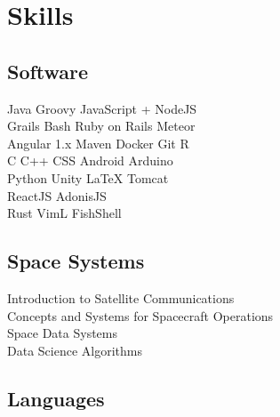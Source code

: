 \documentclass[]{deedy-resume-openfont}
\begin{document}
\begin{minipage}[t]{0.33\textwidth}

\section{Skills}
\subsection{Software}
Java \textbullet{} Groovy \textbullet{} JavaScript + NodeJS \textbullet{} \\
Grails \textbullet{} Bash \textbullet{} Ruby on Rails \textbullet{} Meteor \textbullet{} \\
Angular 1.x \textbullet{} Maven \textbullet{} Docker \textbullet{} Git \textbullet{} R \\
C \textbullet{} C++ \textbullet{} CSS \textbullet{} Android \textbullet{} Arduino \\
Python \textbullet{} Unity \textbullet{} \LaTeX \textbullet{} Tomcat \\
ReactJS \textbullet{} AdonisJS \\
Rust \textbullet{} VimL \textbullet{} FishShell
\sectionsep

\subsection{Space Systems}
Introduction to Satellite Communications \\
Concepts and Systems for Spacecraft Operations \\
Space Data Systems \\
Data Science Algorithms
\sectionsep

\subsection{Languages}
\sectionsep

%
%

\end{minipage}
\hfill
\end{document}
